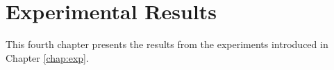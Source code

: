 \chapter{Experimental Results}
\label{chap:results}

This fourth chapter presents the results from the experiments introduced in Chapter \ref{chap:exp}. 










